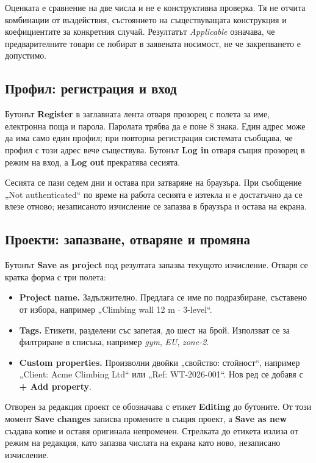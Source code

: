 Оценката е сравнение на две числа и не е конструктивна проверка. Тя не отчита
комбинации от въздействия, състоянието на съществуващата конструкция и коефициентите за
конкретния случай. Резултатът \emph{Applicable} означава, че предварителните товари се
побират в заявената носимост, не че закрепването е допустимо.

\subsection{Профил: регистрация и вход}
\label{subsec:ug-account}

Бутонът \textbf{Register} в заглавната лента отваря прозорец с полета за име,
електронна поща и парола. Паролата трябва да е поне 8 знака. Един адрес може да има
само един профил; при повторна регистрация системата съобщава, че профил с този адрес
вече съществува. Бутонът \textbf{Log in} отваря същия прозорец в режим на вход, а
\textbf{Log out} прекратява сесията.

Сесията се пази седем дни и остава при затваряне на браузъра. При съобщение „Not
authenticated“ по време на работа сесията е изтекла и е достатъчно да се влезе отново;
незаписаното изчисление се запазва в браузъра и остава на екрана.

\subsection{Проекти: запазване, отваряне и промяна}
\label{subsec:ug-projects}

Бутонът \textbf{Save as project} под резултата запазва текущото изчисление. Отваря се
кратка форма с три полета:

\begin{itemize}[topsep=2pt,itemsep=1pt,leftmargin=*]
\item \textbf{Project name.} Задължително. Предлага се име по подразбиране, съставено от
      избора, например „Climbing wall 12 m $\cdot$ 3-level“.
\item \textbf{Tags.} Етикети, разделени със запетая, до шест на брой. Използват се за
      филтриране в списъка, например \emph{gym}, \emph{EU}, \emph{zone-2}.
\item \textbf{Custom properties.} Произволни двойки „свойство: стойност“, например
      „Client: Acme Climbing Ltd“ или „Ref: WT-2026-001“. Нов ред се добавя с
      \textbf{+ Add property}.
\end{itemize}

Отворен за редакция проект се обозначава с етикет \textbf{Editing} до бутоните. От този
момент \textbf{Save changes} записва промените в същия проект, а \textbf{Save as new}
създава копие и оставя оригинала непроменен. Стрелката до етикета излиза от режим на
редакция, като запазва числата на екрана като ново, незаписано изчисление.

